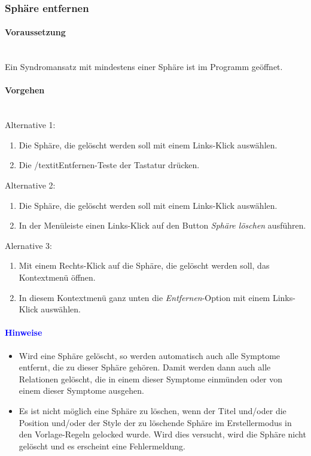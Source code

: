 \documentclass[enabledeprecatedfontcommands,fontsize=11pt,paper=a4,twoside]{scrartcl}
\newcounter{one}
\newcommand*{\hint}{\paragraph{\textcolor{blue}{Hinweise}}}
\newcommand*{\condition}{\paragraph{Voraussetzung}$\;$ \vspace{0.2cm}\\}
\newcommand*{\actions}{\paragraph{Vorgehen} $\;$\vspace{0.2cm}\\}
\begin{document}
		\subsubsection{Sphäre entfernen}
			\condition 	
		Ein Syndromansatz mit mindestens einer Sphäre ist im Programm geöffnet. 
		\actions  
		Alternative 1:
		\begin{enumerate}
			\item Die Sphäre, die gelöscht werden soll mit einem Links-Klick auswählen.
			\item Die /textit{Entfernen}-Teste der Tastatur drücken.
		\end{enumerate}
		Alternative 2:
			\begin{enumerate}
			\item Die Sphäre, die gelöscht werden soll mit einem Links-Klick auswählen.
			\item In der Menüleiste einen Links-Klick auf den Button \textit{Sphäre löschen} ausführen.
		\end{enumerate}
		Alernative 3:
		\begin{enumerate}
			\item Mit einem Rechts-Klick auf die Sphäre, die gelöscht werden soll, das Kontextmenü öffnen. 
			\item In diesem Kontextmenü ganz unten die \textit{Entfernen}-Option mit einem Links-Klick auswählen.
		\end{enumerate}
		\hint
		\begin{itemize}
			\item Wird eine Sphäre gelöscht, so werden automatisch auch alle Symptome entfernt, die zu dieser Sphäre gehören. Damit werden dann auch alle Relationen gelöscht, die in einem dieser Symptome einmünden oder von einem dieser Symptome ausgehen.
			\item Es ist nicht möglich eine Sphäre zu löschen, wenn der Titel und/oder die Position und/oder der Style der zu löschende Sphäre im Erstellermodus in den Vorlage-Regeln gelocked wurde. Wird dies versucht, wird die Sphäre nicht gelöscht und es erscheint eine Fehlermeldung.
		\end{itemize}
\end{document}
